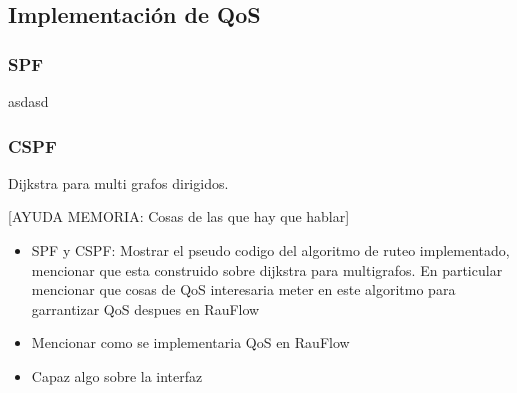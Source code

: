 \newpage
\subsection{Implementaci\'on de QoS}
\label{5.5.4}



\newpage
\subsubsection{SPF}
asdasd

\newpage
\subsubsection{CSPF}
Dijkstra para multi grafos dirigidos.

[AYUDA MEMORIA: Cosas de las que hay que hablar]

\begin{itemize}
\item SPF y CSPF: Mostrar el pseudo codigo del algoritmo de ruteo implementado, mencionar que esta construido sobre dijkstra para multigrafos. En particular mencionar que cosas de QoS interesaria meter en este algoritmo para garrantizar QoS despues en RauFlow

\item Mencionar como se implementaria QoS en RauFlow

\item Capaz algo sobre la interfaz 
\end{itemize}
